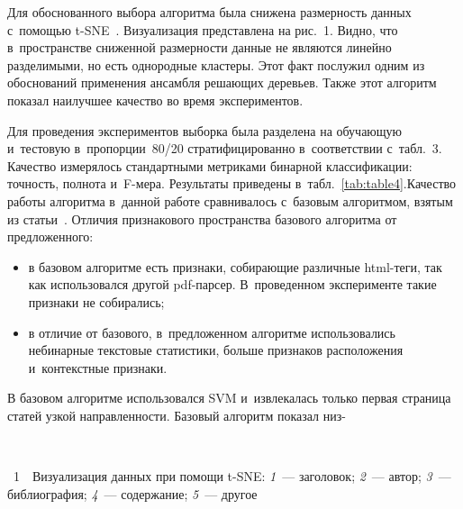 \begin{multicols}{2}
Для обоснованного выбора алгоритма была снижена раз\-мер\-ность данных 
с~по\-мощью t-SNE~\cite{Maaten}. Визуализация пред\-став\-ле\-на на рис.~1. 
Видно, что в~про\-стран\-ст\-ве сниженной раз\-мер\-ности данные не 
являются линейно разделимыми, но есть однородные клас\-те\-ры. Этот факт по\-слу\-жил 
одним из обос\-но\-ва\-ний применения ан\-самб\-ля ре\-ша\-ющих деревьев. Также этот алгоритм 
показал наилучшее качество во время экспериментов.


Для проведения экспериментов выборка была разделена на обуча\-ющую и~тес\-то\-вую 
в~пропорции~80/20 стратифицированно в~соответствии с~табл.~3. 
Качество измерялось стандартными мет\-ри\-ка\-ми бинарной классификации: точ\-ность, 
пол\-но\-та и~F-ме\-ра. Результаты приведены в~табл.~\ref{tab:table4}.\linebreak Качество работы 
алгоритма в~данной работе срав\-ни\-ва\-лось с~базовым алгоритмом, взятым из 
\mbox{статьи}~\cite{Kovacevic}. Отличия признакового про\-стран\-ст\-ва базового алгоритма от 
предложенного:
\begin{itemize}
\item
в базовом алгоритме есть признаки, со\-би\-ра\-ющие раз\-лич\-ные html-те\-ги, так как 
использовался другой pdf-пар\-сер. В~проведенном эксперименте такие признаки не 
собирались;

\item
в отличие от базового, в~предложенном алгоритме использовались небинарные 
текстовые статистики, больше признаков расположения и~кон\-текст\-ные признаки.
\end{itemize}


В базовом алгоритме использовался SVM и~извлекалась только первая страница 
статей узкой на\-прав\-лен\-ности. Базовый алгоритм показал низ-\linebreak\vspace*{-12pt}

 { \begin{center}  %
 \vspace*{9pt}
  \mbox{%
 \epsfxsize=74.724mm 
 }


\end{center}


\noindent
{{\figurename~1}\ \ \small{Визуализация данных при помощи t-SNE: 
    \textit{1}~--- заголовок;
        \textit{2}~--- автор;  \textit{3}~--- биб\-лио\-гра\-фия;
            \textit{4}~--- содержание;
        \textit{5}~--- другое}}
}



\end{multicols}
